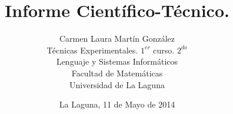 \documentclass[spanish,a4paper,10pt]{article}
\begin{document}
\title{Informe Científico-Técnico.}
\author{Carmen Laura Martín González \\ Técnicas Experimentales. $1^{er}$ curso. $2^{do}$ \\ Lenguaje y Sistemas Informáticos \\ Facultad de Matemáticas \\ Universidad de La Laguna}
\date{La Laguna, 11 de Mayo de 2014}
\end{document}
